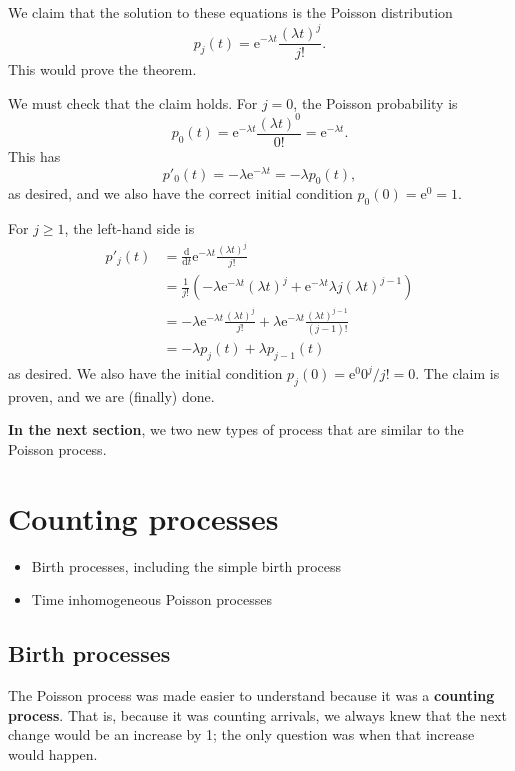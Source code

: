 \documentclass[
  a4paper,
]{article}
\providecommand{\tightlist}{%
  \setlength{\itemsep}{0pt}\setlength{\parskip}{0pt}}
\theoremstyle{definition}
\theoremstyle{definition}
\theoremstyle{definition}
\theoremstyle{remark}
\begin{document}
We claim that the solution to these equations is the Poisson distribution
\[ p_j(t) = \mathrm{e}^{-\lambda t} \frac{(\lambda t)^j}{j!} . \]
This would prove the theorem.

We must check that the claim holds. For \(j = 0\), the Poisson probability is
\[ p_0(t) = \mathrm{e}^{-\lambda t} \frac{(\lambda t)^0}{0!} = \mathrm{e}^{-\lambda t} . \]
This has
\[ p'_0(t) = -\lambda \mathrm{e}^{-\lambda t} = -\lambda p_0(t) , \]
as desired, and we also have the correct initial condition \(p_0(0) = \mathrm{e}^{0} = 1\).

For \(j \geq 1\), the left-hand side is
\begin{align*}
p'_j(t) &= \frac{\mathrm d}{\mathrm d t} \mathrm{e}^{-\lambda t} \frac{(\lambda t)^j}{j!} \\
& = \frac{1}{j!} \left(-\lambda \mathrm{e}^{-\lambda t}(\lambda t)^j + \mathrm{e}^{-\lambda t} \lambda j(\lambda t)^{j-1} \right) \\
&= - \lambda \mathrm{e}^{-\lambda t} \frac{(\lambda t)^j}{j!} + \lambda \mathrm{e}^{-\lambda t} \frac{(\lambda t)^{j-1}}{(j-1)!} \\
&= -\lambda p_j(t) + \lambda p_{j-1}(t)
\end{align*}
as desired. We also have the initial condition \(p_j(0) = \mathrm{e}^{0} 0^j/j! = 0\).
The claim is proven, and we are (finally) done.

\textbf{In the next section}, we two new types of process that are similar to the Poisson process.

\hypertarget{S16-counting-processes}{%
\section{Counting processes}\label{S16-counting-processes}}

\begin{itemize}
\tightlist
\item
  Birth processes, including the simple birth process
\item
  Time inhomogeneous Poisson processes
\end{itemize}

\hypertarget{birth-processes}{%
\subsection{Birth processes}\label{birth-processes}}

The Poisson process was made easier to understand because it was a \textbf{counting process}. That is, because it was counting arrivals, we always knew that the next change would be an increase by 1; the only question was when that increase would happen.
\end{document}
